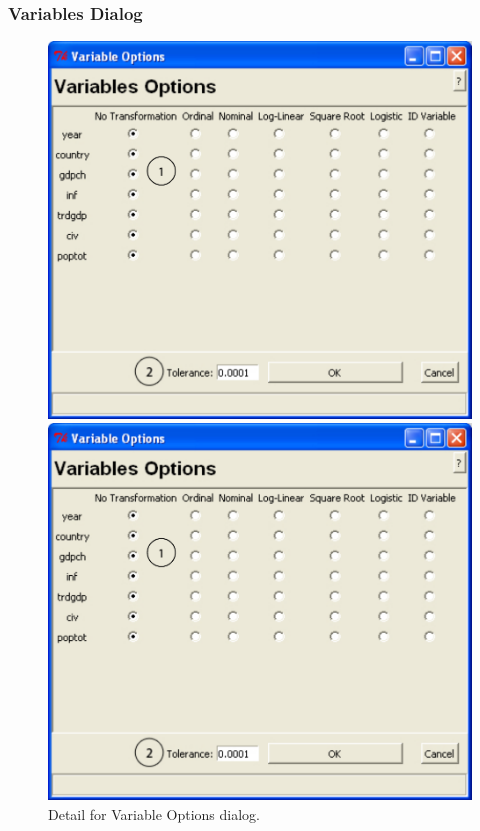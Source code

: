 \documentclass[12pt,titlepage]{article}
\begin{document}
\subsubsection{Variables Dialog}
\label{sec:vardiag}
\begin{figure}[ht]
 \begin{htmlonly} 
  \centering \includegraphics[scale=1]{varopts} 
 \end{htmlonly}
 \begin{latexonly}
  \centering \includegraphics[scale=.75]{varopts}
 \end{latexonly}
  \caption{Detail for Variable Options dialog.}
\end{figure}
\end{document}
